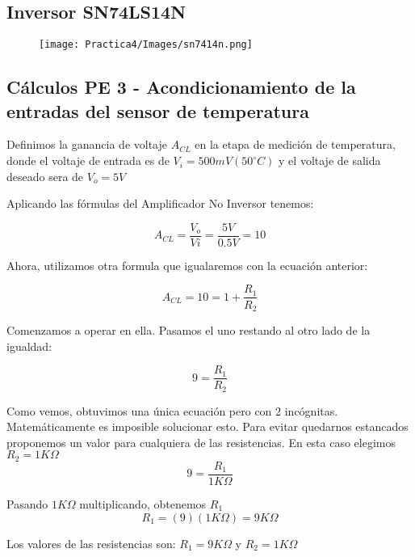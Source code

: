 \documentclass[12pt]{article}
\begin{document}
        \subsection{Inversor SN74LS14N}
        \begin{figure}[h!]
                \centering
                \texttt{[image: Practica4/Images/sn7414n.png]}
        \end{figure}
            
            
    	\newpage
		\subsection{Cálculos PE 3 - Acondicionamiento de la entradas del sensor de temperatura}
		
		\item Definimos la ganancia de voltaje $A_{CL}$ en la etapa de medición de temperatura, donde el voltaje de entrada es de $V_{i}=500 mV (50^{\circ}C)$ y el voltaje de salida deseado sera de $V_{o}=5 V$
        		
        Aplicando las fórmulas del Amplificador No Inversor tenemos:

        				$$ A_{CL} = \frac{V_{o}}{V{i}} = \frac{5 V}{0.5 V} = 10 $$
        				
        				
        	\item Ahora, utilizamos otra formula que igualaremos con la ecuación anterior:
        	
        	$$ A_{CL} =
        				10 = 1 + \frac{R_{1}}{R_{2}} $$
        				
            \item Comenzamos a operar en ella. Pasamos el uno restando al otro lado de la igualdad:
            
            $$ 9 = \frac{R_{1}}{R_{2}} $$
        	
        	\item Como vemos, obtuvimos una única ecuación pero con 2 incógnitas. Matemáticamente es imposible solucionar esto. Para evitar quedarnos estancados proponemos un valor para cualquiera de las resistencias. En esta caso elegimos $R_{2} = 1K\Omega$
        	\\
        	$$ 9 = \frac{R_{1}}{1K\Omega} $$
            
            \item Pasando $1K\Omega$ multiplicando, obtenemos $R_{1}$
            \\
            $$ R_{1} = (9)(1K\Omega) = 9K\Omega $$
            
            \item Los valores de las resistencias son: $R_{1} = 9K\Omega$ y $R_{2} = 1K\Omega$
		


	\nocite{ref1}
	
        

	
\end{document}
